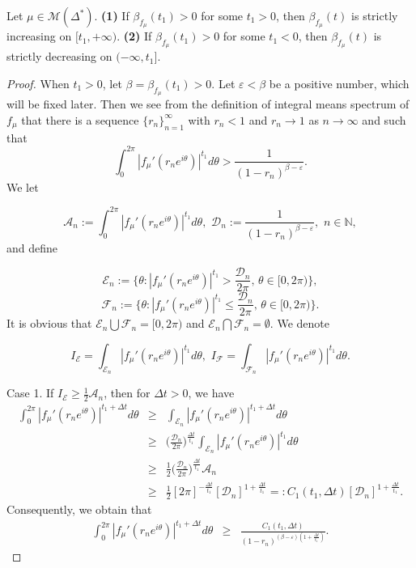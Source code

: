 \documentclass[10pt,a4paper]{amsart}
\begin{document}
\begin{lemma}\label{m-l}
Let $\mu\in \mathcal{M}(\Delta^{*})$. {\bf (1)} If $\beta_{f_{\mu}}(t_1)>0$ for some $t_1>0$,  then $\beta_{f_{\mu}}(t)$ is strictly increasing on $[t_1, +\infty)$. 
 {\bf (2)} If $\beta_{f_{\mu}}(t_1)>0$ for some $t_1<0$,  then $\beta_{f_{\mu}}(t)$ is strictly decreasing on $(-\infty, t_1]$. 
\end{lemma}

\begin{proof}
When $t_1>0$, let $\beta=\beta_{f_{\mu}}(t_1)>0$.  Let $\varepsilon<\beta$ be a positive number, which will be fixed later. Then we see from the definition of integral means spectrum of $f_{\mu}$ that  
there is a sequence $\{r_n\}_{n=1}^{\infty}$  with $r_n<1$ and $r_n \rightarrow 1$ as $n\rightarrow \infty$ and such that
\begin{equation}
\int_{0}^{2\pi} |f_{\mu}'(r_ne^{i\theta})|^{t_1} d\theta > \frac{1}{(1-r_n)^{\beta-\varepsilon}}.\nonumber
\end{equation}
We let

$$\mathcal{A}_n:=\int_{0}^{2\pi} |f_{\mu}'(r_ne^{i\theta})|^{t_1} d\theta, \, \,\mathcal{D}_n:= \frac{1}{(1-r_n)^{\beta-\varepsilon}},\,\, n\in \mathbb{N},$$
and define 

$${\mathcal{E}}_n:=\{\theta:  |f_{\mu}'(r_ne^{i\theta})|^{t_1}> \frac{\mathcal{D}_n}{2\pi}, \, \theta\in [0, 2\pi)\}, $$
$$\mathcal{F}_n:=\{\theta:  |f_{\mu}'(r_ne^{i\theta})|^{t_1}\leq \frac{\mathcal{D}_n}{2\pi},\, \theta\in [0,2\pi)\}.$$
It is obvious that $\mathcal{E}_n \bigcup \mathcal{F}_n=[0, 2\pi)$ and $\mathcal{E}_n \bigcap \mathcal{F}_n=\emptyset.$ We denote 

$$I_{\mathcal{E}}=\int_{\mathcal{E}_n} |f_{\mu}'(r_ne^{i\theta})|^{t_1} d\theta, \,\, I_{\mathcal{F}}=\int_{\mathcal{F}_n} |f_{\mu}'(r_ne^{i\theta})|^{t_1} d\theta.$$

Case 1.  If $I_{\mathcal{E}} \geq \frac{1}{2}\mathcal{A}_n$, then for $\Delta t>0$,  we have 
\begin{eqnarray}
\int_{0}^{2\pi}|f_{\mu}'(r_ne^{i\theta})|^{t_1+\Delta t} d\theta & \geq & \int_{\mathcal{E}_n}|f_{\mu}'(r_ne^{i\theta})|^{t_1+\Delta t} d\theta  \nonumber \\
& \geq & \Big(\frac{\mathcal{D}_n}{2\pi}\Big)^{\frac{\Delta t}{t_1}} \int_{\mathcal{E}_n}|f_{\mu}'(r_ne^{i\theta})|^{t_1} d\theta \nonumber \\
&\geq &\frac{1}{2} \Big(\frac{\mathcal{D}_n}{2\pi}\Big)^{\frac{\Delta t}{t_1}}\mathcal{A}_n \nonumber \\
&\geq  & \frac{1}{2}[2\pi]^{-\frac{\Delta t}{t_1}} [\mathcal{D}_n]^{1+\frac{\Delta t}{t_1}}=:C_1(t_1, \Delta t)[\mathcal{D}_n]^{1+\frac{\Delta t}{t_1}}. \nonumber
\end{eqnarray}
Consequently, we obtain that 
\begin{eqnarray}\label{i}
\int_{0}^{2\pi}|f_{\mu}'(r_ne^{i\theta})|^{t_1+\Delta t} d\theta&\geq  & \frac{ C_1(t_1, \Delta t)}{(1-r_n)^{(\beta-\varepsilon)(1+\frac{\Delta t}{t_1})}}. 
\end{eqnarray}


\end{proof}
\end{document}
